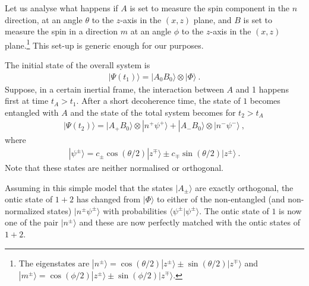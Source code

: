\documentclass[%
preprint,
nofootinbib,
 amsmath,amssymb,
aps,
]{revtex4-1}
\def\bra#1{\langle #1|}
\def\ket#1{| #1\rangle}
\newcommand{\EQ}[1]{\begin{equation}\begin{split} #1
\end{split}\end{equation}}
\begin{document}
Let us analyse what happens if $A$ is set to measure the spin component in the $n$ direction, at an angle $\theta$ to the $z$-axis in the $(x,z)$ plane, and $B$ is set to measure the spin in a direction $m$ at an angle $\phi$ to the $z$-axis in the $(x,z)$ plane.\footnote{The eigenstates are $\ket{n^\pm}=\cos(\theta/2)\ket{z^\pm}\pm\sin(\theta/2)\ket{z^\mp}$ and  $\ket{m^\pm}=\cos(\phi/2)\ket{z^\pm}\pm\sin(\phi/2)\ket{z^\mp}$.} This set-up is generic enough for our purposes. 

The initial state of the overall system is
\EQ{
\ket{\Psi(t_1)}=\ket{A_0 B_0}\otimes\ket{\Phi}\ .
\label{sw1}
}
Suppose, in a certain inertial frame, the interaction between $A$ and 1 happens first at time $t_A>t_1$. After a short decoherence time, the state of $1$ becomes entangled with $A$ and the state of the total system becomes for $t_2>t_A$
\EQ{
\ket{\Psi(t_2)}=\ket{A_+B_0}\otimes\ket{n^+\psi^+}+\ket{A_-B_0}\otimes\ket{n^-\psi^-}\ ,
}
where
\EQ{
\ket{\psi^\pm}=c_\pm\cos(\theta/2)\ket{z^\mp}\pm c_\mp\sin(\theta/2)\ket{z^\pm}\ .
\label{l23}
}
Note that these states are neither normalised or orthogonal.

Assuming in this simple model that the states $\ket{A_\pm}$ are exactly orthogonal, the ontic state of $1+2$ has changed from $\ket{\Phi}$ to either of the non-entangled (and non-normalized states) $\ket{n^\pm\psi^\pm}$
with probabilities $\bra{\psi^\pm}\psi^{\pm}\rangle$. The ontic state of $1$ is now one of the pair $\ket{n^\pm}$ and these are now perfectly matched with the ontic states of $1+2$.
\end{document}

